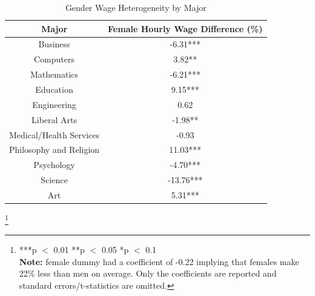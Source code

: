 \documentclass[12pt]{article}
\newcommand\blfootnote[1]{%
  \begingroup
  \renewcommand\thefootnote{}\footnote{#1}%
  \addtocounter{footnote}{-1}%
  \endgroup
}
\begin{document}
\begin{center}
\begin{table}[H]
\centering
\caption{Gender Wage Heterogeneity by Major}
\begin{tabular}{|c |c|}
\hline
\textbf{Major} & \textbf{Female Hourly Wage Difference (\%)} \\
\hline
Business & -6.31*** \\
Computers & 3.82** \\
Mathematics & -6.21*** \\
Education & 9.15*** \\
Engineering & 0.62 \\
Liberal Arts & -1.98** \\
Medical/Health Services & -0.93 \\
Philosophy and Religion & 11.03*** \\
Psychology & -4.70*** \\
Science & -13.76*** \\
Art & 5.31*** \\
\hline
\end{tabular}
\end{table}
\blfootnote{***p $<$ 0.01 **p $<$ 0.05 *p $<$ 0.1 \\ \textbf{Note:} female dummy had a coefficient of -0.22 implying that females make 22\% less than men on average. Only the coefficients are reported and standard errors/t-statistics are omitted.}
\end{center}
\end{document}
